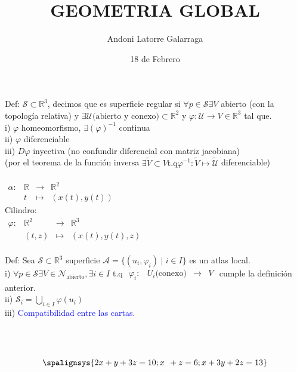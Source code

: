 \documentclass{article}
\title{GEOMETRIA GLOBAL}
\author{Andoni Latorre Galarraga}
\date{18 de Febrero}
\newcommand{\bb}[1]{\mathbb{#1}}
\begin{document}
\maketitle
Def: $\mathcal{S}\subset \bb{R}^3$, decimos que es superficie regular si $\forall p \in \mathcal{S} \exists V$ abierto (con la topología relativa) y $\exists \mathcal{U} \text{(abierto y conexo)} \subset \bb{R}^2$ y $\varphi : \mathcal{U} \longrightarrow V\in \bb{R}^3 $ tal que.\\
i) $\varphi$ homeomorfismo, $\exists (\varphi)^{-1}$ continua \\
ii) $\varphi$ diferenciable \\
iii) $D\varphi$ inyectiva (no confundir diferencial con matriz jacobiana)\\
(por el teorema de la función inversa $\exists \tilde{V}\subset V \text{t.q} \varphi^{-1} : \tilde{V}\longmapsto \tilde{\mathcal{U}}$ diferenciable)
\\
\\
$\begin{array}{crcl}
\alpha : & \bb{R} & \longrightarrow & \bb{R}^2 \\
& t & \longmapsto     & (x(t),y(t))
\end{array}$\\
Cilindro:\\
$\begin{array}{crcl}
\varphi : & \bb{R}^2 & \longrightarrow & \bb{R}^3 \\
& (t,z) & \longmapsto     & (x(t),y(t),z)
\end{array}$\\\\
Def: Sea $\mathcal{S}\subset \bb{R}^3$ superficie $\mathcal{A}= \{(u_i, \varphi_i) \mid i\in I\}$ es un atlas local.\\
i) $\forall p \in \mathcal{S} \exists V \in \mathcal{N}_\text{abierto}, \exists i \in I$ t.q $\begin{array}{crcl}
\varphi_i : & U_i\text{(conexo)} & \longrightarrow & V
\end{array}$ cumple la definición anterior.\\
ii) $\mathcal{S}_i = \bigcup_{i\in I} \varphi(u_i) $\\
iii) \textcolor{blue}{Compatibilidad entre las cartas.}\\\\
\\
\\
$$
\spalignsys{
    2x +  y + 3z = 10 ;
     x \:  \: +  z =  6 ;
     x + 3y + 2z = 13
}
$$
\end{document}
